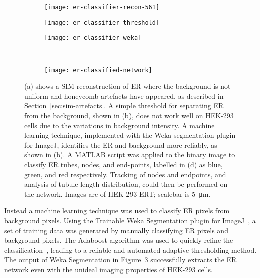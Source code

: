 \begin{figure}[p!]
	\centering
	\begin{subfigure}[b]{0.325\textwidth}
		\texttt{[image: er-classifier-recon-561]}
		\caption{} \label{fig:er-classifier-recon-561}
	\end{subfigure}
	\hfill
	\begin{subfigure}[b]{0.325\textwidth}
		\texttt{[image: er-classifier-threshold]}
		\caption{} \label{fig:ER-classifier-threshold}
	\end{subfigure}
	\hfill
	\begin{subfigure}[b]{0.325\textwidth}
		\texttt{[image: er-classifier-weka]}
		\caption{} \label{fig:ER-classifier-weka}
	\end{subfigure}

	~\newline
	\begin{subfigure}[b]{0.8\textwidth}
		\texttt{[image: er-classified-network]}
		\caption{} \label{fig:er-classified-network}
	\end{subfigure}
	\caption[ER: Weka segmentation allows the ER network to be extracted from a non-uniform background]{(a) shows a SIM reconstruction of ER where the background is not uniform and honeycomb artefacts have appeared, as described in Section~\ref{sec:sim-artefacts}. A simple threshold for separating ER from the background, shown in (b), does not work well on HEK-293 cells due to the variations in background intensity. A machine learning technique, implemented with the Weka segmentation plugin for ImageJ, identifies the ER and background more reliably, as shown in (b). A MATLAB script was applied to the binary image to classify ER tubes, nodes, and end-points, labelled in (d) as blue, green, and red respectively. Tracking of nodes and endpoints, and analysis of tubule length distribution, could then be performed on the network. Images are of HEK-293-ERT; scalebar is \SI{5}{\micro\metre}. }
	\label{fig:ER-classifier}
\end{figure}

Instead a machine learning technique was used to classify ER pixels from background pixels.
Using the Trainable Weka Segmentation plugin for ImageJ~\cite{arganda2017trainable}, a set of training data was generated by manually classifying ER pixels and background pixels.
The Adaboost algorithm was used to quickly refine the classification~\cite{freund1997decision, schapire1999brief}, leading to a reliable and automated adaptive thresholding method.
The output of Weka Segmentation in Figure~\ref{fig:ER-classifier-weka} successfully extracts the ER network even with the unideal imaging properties of HEK-293 cells.

